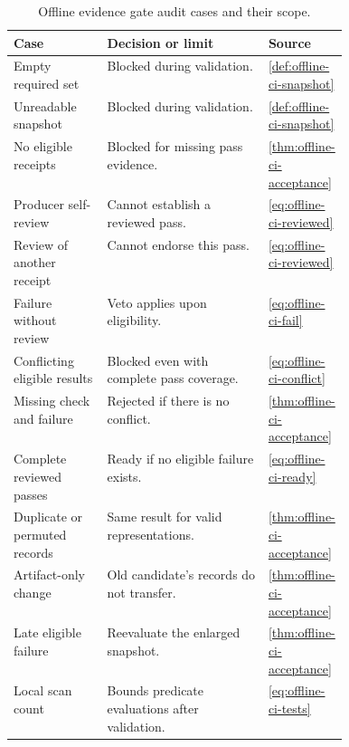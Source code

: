 \begin{table}[!htbp]
\centering
\small
\caption{Offline evidence gate audit cases and their scope.}
\label{tab:offline-ci-audit}
\begin{tabularx}{\linewidth}{@{}p{0.28\linewidth}X p{0.15\linewidth}@{}}
\toprule
Case & Decision or limit & Source \\
\midrule
Empty required set & Blocked during validation. & \ref{def:offline-ci-snapshot} \\
Unreadable snapshot & Blocked during validation. & \ref{def:offline-ci-snapshot} \\
No eligible receipts & Blocked for missing pass evidence. & \ref{thm:offline-ci-acceptance} \\
Producer self-review & Cannot establish a reviewed pass. & \ref{eq:offline-ci-reviewed} \\
Review of another receipt & Cannot endorse this pass. & \ref{eq:offline-ci-reviewed} \\
Failure without review & Veto applies upon eligibility. & \ref{eq:offline-ci-fail} \\
Conflicting eligible results & Blocked even with complete pass coverage. & \ref{eq:offline-ci-conflict} \\
Missing check and failure & Rejected if there is no conflict. & \ref{thm:offline-ci-acceptance} \\
Complete reviewed passes & Ready if no eligible failure exists. & \ref{eq:offline-ci-ready} \\
Duplicate or permuted records & Same result for valid representations. & \ref{thm:offline-ci-acceptance} \\
Artifact-only change & Old candidate's records do not transfer. & \ref{thm:offline-ci-acceptance} \\
Late eligible failure & Reevaluate the enlarged snapshot. & \ref{thm:offline-ci-acceptance} \\
Local scan count & Bounds predicate evaluations after validation. & \ref{eq:offline-ci-tests} \\
\bottomrule
\end{tabularx}
\end{table}
\clearpage
